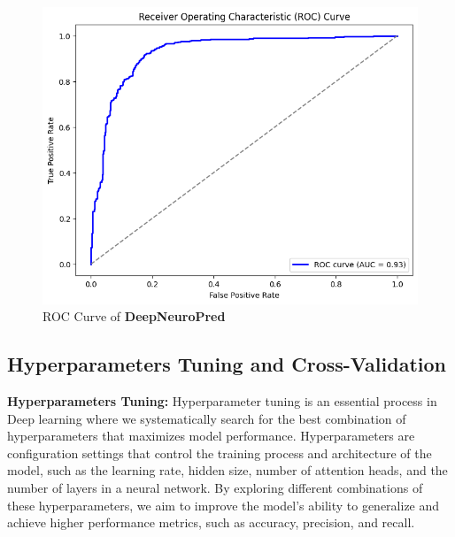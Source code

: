 \documentclass[conference]{IEEEtran}
\begin{document}
\begin{figure}[h]
\centering
\vspace{-.6em}
\includegraphics[width=0.8\linewidth]{Images/8.png}
\vspace{-.3em}
\caption{ROC Curve of \textbf{DeepNeuroPred}}
\label{fig:roc_curve}
\end{figure}

\subsection{Hyperparameters Tuning and Cross-Validation}

\textbf{Hyperparameters Tuning:}  
Hyperparameter tuning is an essential process in Deep learning where we systematically search for the best combination of hyperparameters that maximizes model performance. Hyperparameters are configuration settings that control the training process and architecture of the model, such as the learning rate, hidden size, number of attention heads, and the number of layers in a neural network. By exploring different combinations of these hyperparameters, we aim to improve the model's ability to generalize and achieve higher performance metrics, such as accuracy, precision, and recall.
\end{document}
